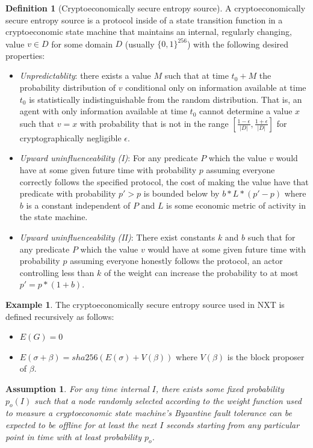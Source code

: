 \documentclass[11pt,a4paper]{article}
\theoremstyle{plain}
\newtheorem{assm}{Assumption}[section]
\theoremstyle{definition}
\newtheorem{defn}{Definition}[section]
\newtheorem{exmp}{Example}[section]
\theoremstyle{remark}
\begin{document}
\begin{defn}[Cryptoeconomically secure entropy source]
A cryptoeconomically secure entropy source is a protocol inside of a state transition function in a cryptoeconomic state machine that maintains an internal, regularly changing, value $v \in D$ for some domain $D$ (usually $\{0,1\}^{256}$) with the following desired properties:
\begin{itemize}
\item \emph{Unpredictablity}: there exists a value $M$ such that at time $t_0 + M$ the probability distribution of $v$ conditional only on information available at time $t_0$ is statistically indistinguishable from the random distribution. That is, an agent with only information available at time $t_0$ cannot determine a value $x$ such that $v = x$ with probability that is not in the range $[\frac{1 - \epsilon}{|D|}, \frac{1 + \epsilon}{|D|}]$ for cryptographically negligible $\epsilon$.
\item \emph{Upward uninfluenceability (I)}: For any predicate $P$ which the value $v$ would have at some given future time with probability $p$ assuming everyone correctly follows the specified protocol, the cost of making the value have that predicate with probability $p' > p$ is bounded below by $b * L * (p' - p)$ where $b$ is a constant independent of $P$ and $L$ is some economic metric of activity in the state machine.
\item \emph{Upward uninfluenceability (II)}: There exist constants $k$ and $b$ such that for any predicate $P$ which the value $v$ would have at some given future time with probability $p$ assuming everyone honestly follows the protocol, an actor controlling less than $k$ of the weight can increase the probability to at most $p' = p * (1 + b)$.
\end{itemize}
\end{defn}

\begin{exmp}
The cryptoeconomically secure entropy source used in NXT\cite{nxtinside} is defined recursively as follows:
\begin{itemize}
\item
$E(G) = 0$
\item 
$E(\sigma + \beta) = sha256(E(\sigma) + V(\beta))$ where $V(\beta)$ is the block proposer of $\beta$.
\end{itemize}
\end{exmp}

\begin{assm}
For any time internal $I$, there exists some fixed probability $p_o(I)$ such that a node randomly selected according to the weight function used to measure a cryptoeconomic state machine's Byzantine fault tolerance can be expected to be offline for at least the next $I$ seconds starting from any particular point in time with at least probability $p_o$.
\end{assm}
\end{document}

